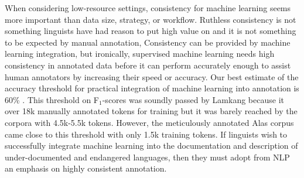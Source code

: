 When considering low-resource settings, consistency for machine learning seems more important than data size, strategy, or workflow. Ruthless consistency is not something linguists have had reason to put high value on and it is not something to be expected by manual annotation, %
Consistency can be provided by machine learning integration, but ironically, supervised machine learning needs high consistency in annotated data before it can perform accurately enough to assist human annotators by increasing their speed or accuracy. Our best estimate of the accuracy threshold for practical integration of machine learning into annotation is 60\% \citep{felt_improving_2012}. This threshold on F$_1$-scores was soundly passed by Lamkang because it over 18k manually annotated tokens for training but it was barely reached by the corpora with 4.5k-5.5k tokens. However, the meticulously annotated Alas corpus came close to this threshold with only 1.5k training tokens. If linguists wish to successfully integrate machine learning into the documentation and description of under-documented and endangered languages, then they must adopt from NLP an emphasis on highly consistent annotation.



